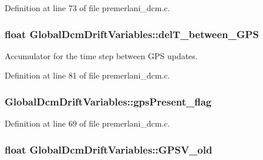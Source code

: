 Definition at line 73 of file premerlani\-\_\-dcm.\-c.

\hypertarget{struct_global_dcm_drift_variables_a00e780a5b38ecb97c9daccd52b0ef4cf}{
\subsubsection[{del\-T\-\_\-between\-\_\-\-G\-P\-S}]{\setlength{\rightskip}{0pt plus 5cm}float Global\-Dcm\-Drift\-Variables\-::del\-T\-\_\-between\-\_\-\-G\-P\-S}}\label{struct_global_dcm_drift_variables_a00e780a5b38ecb97c9daccd52b0ef4cf}


Accumulator for the time step between G\-P\-S updates. 



Definition at line 81 of file premerlani\-\_\-dcm.\-c.

\hypertarget{struct_global_dcm_drift_variables_ac7e3400f33023d97c131553ebefc9ce8}{
\subsubsection[{gps\-Present\-\_\-flag}]{ Global\-Dcm\-Drift\-Variables\-::gps\-Present\-\_\-flag}}\label{struct_global_dcm_drift_variables_ac7e3400f33023d97c131553ebefc9ce8}


Definition at line 69 of file premerlani\-\_\-dcm.\-c.

\hypertarget{struct_global_dcm_drift_variables_afb3e9353cbef8439a6f132ba9af70a3f}{
\subsubsection[{G\-P\-S\-V\-\_\-old}]{\setlength{\rightskip}{0pt plus 5cm}float Global\-Dcm\-Drift\-Variables\-::\-G\-P\-S\-V\-\_\-old}}\label{struct_global_dcm_drift_variables_afb3e9353cbef8439a6f132ba9af70a3f}


